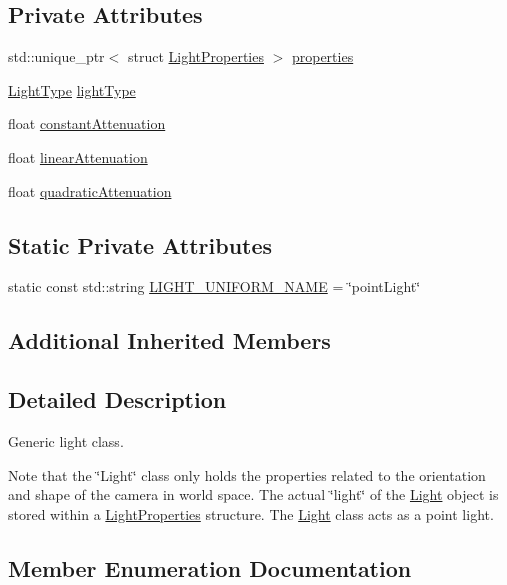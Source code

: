 \subsection*{Private Attributes}
\begin{DoxyCompactItemize}
\item 
std\+::unique\+\_\+ptr$<$ struct \hyperlink{struct_light_properties}{Light\+Properties} $>$ \hyperlink{class_light_a74eba4cac1cc27e741230fbda32fceef}{properties}
\item 
\hyperlink{class_light_a661d9480e01af8b1612860b9630ef5f8}{Light\+Type} \hyperlink{class_light_ab0c279c927973443f7b52fc924b489aa}{light\+Type}
\item 
float \hyperlink{class_light_afef6c00a21aa16dc6cc7a7fb1639d2fa}{constant\+Attenuation}
\item 
float \hyperlink{class_light_afcb2da592197efae015ae16c1c5bfceb}{linear\+Attenuation}
\item 
float \hyperlink{class_light_a0f24dde11cbbd12d0f0309e189f3640c}{quadratic\+Attenuation}
\end{DoxyCompactItemize}
\subsection*{Static Private Attributes}
\begin{DoxyCompactItemize}
\item 
static const std\+::string \hyperlink{class_light_ab2d40f6c364cf728d03a90ff885e37cb}{L\+I\+G\+H\+T\+\_\+\+U\+N\+I\+F\+O\+R\+M\+\_\+\+N\+A\+ME} = \char`\"{}point\+Light\char`\"{}
\end{DoxyCompactItemize}
\subsection*{Additional Inherited Members}


\subsection{Detailed Description}
Generic light class. 

Note that the \char`\"{}\+Light\char`\"{} class only holds the properties related to the orientation and shape of the camera in world space. The actual \char`\"{}light\char`\"{} of the \hyperlink{class_light}{Light} object is stored within a \hyperlink{struct_light_properties}{Light\+Properties} structure. The \hyperlink{class_light}{Light} class acts as a point light. 

\subsection{Member Enumeration Documentation}
\hypertarget{class_light_a661d9480e01af8b1612860b9630ef5f8}{}\label{class_light_a661d9480e01af8b1612860b9630ef5f8} 
